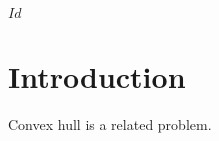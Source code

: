 
\svnInfo $Id$

\chapter{Introduction\sectionRevision}
\label{chap:Introduction}
Convex hull is a related problem.
